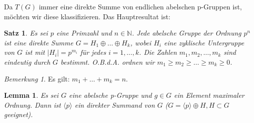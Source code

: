 \documentclass[12pt]{scrartcl} %
\newtheorem{thm}{Satz}
\newtheorem{lemma}{Lemma}
\theoremstyle{definition}
\theoremstyle{remark}
\newtheorem*{nb}{Bemerkung}
\begin{document}
Da $T(G)$ immer eine direkte Summe von endlichen abelschen p-Gruppen ist, möchten wir diese klassifizieren. Das Hauptresultat ist:

\begin{thm}
Es sei $p$ eine Primzahl und $n\in \mathbb{N}$. 
Jede abelsche Gruppe der Ordnung $p^n$ ist eine direkte Summe $G=H_{1}\oplus \dots\oplus H_{k}$, wobei $H_{i}$ eine zyklische Untergruppe von $G$ ist mit $|H_{i}|=p^{m_{i}}$ für jedes $i=1,\dots,k$.
Die Zahlen $m_1,m_2,\dots,m_k$ sind eindeutig durch $G$ bestimmt. O.B.d.A. ordnen wir $m_{1}\geq m_{2}\geq \dots\geq m_{k}\geq 0$.
\end{thm}

\begin{nb}
Es gilt: $m_{1}+\dots+m_{k}=n$.
\end{nb}

\begin{lemma}
Es sei $G$ eine abelsche p-Gruppe und $g\in G$ ein Element maximaler Ordnung. 
Dann ist $\langle p\rangle$ ein direkter Summand von $G$ ($G=\langle p\rangle\oplus H, H\subset G$ geeignet).
\end{lemma}
\end{document}

